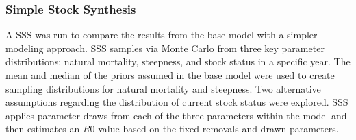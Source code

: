 \documentclass[11pt,
  english,
  a4paper,
]{article}
\begin{document}

\hypertarget{simple-stock-synthesis}{%
\subsubsection{Simple Stock Synthesis}\label{simple-stock-synthesis}}

\leavevmode\tagmcend\tagstructend


A SSS was run to compare the results from the base model with a simpler modeling approach. SSS samples via Monte Carlo from three key parameter distributions: natural mortality, steepness, and stock status in a specific year. The mean and median of the priors assumed in the base model were used to create sampling distributions for natural mortality and steepness. Two alternative assumptions regarding the distribution of current stock status were explored. SSS applies parameter draws from each of the three parameters within the model and then estimates an {\(R0\)\leavevmode\tagmcend\tagstructend} value based on the fixed removals and drawn parameters.

\leavevmode\tagmcend\tagstructend\par
\end{document}
